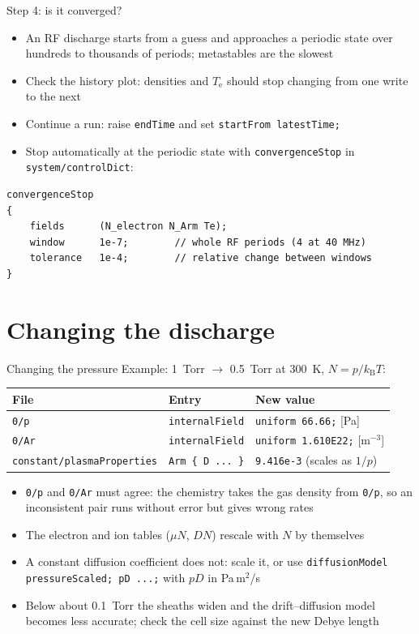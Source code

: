 \documentclass[aspectratio=169,11pt]{beamer}
\newcommand{\kw}[1]{\texttt{#1}}
\newcommand{\Te}{T_\mathrm{e}}
\begin{document}
\begin{frame}[fragile]{Step 4: is it converged?}
  \begin{itemize}
    \item An RF discharge starts from a guess and approaches a periodic state over
          hundreds to thousands of periods; metastables are the slowest
    \item Check the history plot: densities and $\Te$ should stop changing from one
          write to the next
    \item Continue a run: raise \kw{endTime} and set \kw{startFrom latestTime;}
    \item Stop automatically at the periodic state with \kw{convergenceStop} in
          \kw{system/controlDict}:
  \end{itemize}
  \small
\begin{verbatim}
convergenceStop
{
    fields      (N_electron N_Arm Te);
    window      1e-7;        // whole RF periods (4 at 40 MHz)
    tolerance   1e-4;        // relative change between windows
}
\end{verbatim}
\end{frame}

\section{Changing the discharge}

\begin{frame}[fragile]{Changing the pressure}
  Example: 1~Torr $\rightarrow$ 0.5~Torr at 300~K, $N=p/k_\mathrm{B}T$:
  \begin{center}\small
  \begin{tabular}{lll}
    \toprule
    File & Entry & New value \\
    \midrule
    \kw{0/p} & \kw{internalField} & \kw{uniform 66.66;} [Pa] \\
    \kw{0/Ar} & \kw{internalField} & \kw{uniform 1.610E22;} [m$^{-3}$] \\
    \kw{constant/plasmaProperties} & \kw{Arm \{ D ... \}} & \kw{9.416e-3} (scales as $1/p$) \\
    \bottomrule
  \end{tabular}
  \end{center}
  \begin{itemize}\small
    \item \kw{0/p} and \kw{0/Ar} must agree: the chemistry takes the gas density from
          \kw{0/p}, so an inconsistent pair runs without error but gives wrong rates
    \item The electron and ion tables ($\mu N$, $DN$) rescale with $N$ by themselves
    \item A constant diffusion coefficient does not: scale it, or use
          \kw{diffusionModel pressureScaled; pD ...;} with $pD$ in Pa\,m$^2$/s
    \item Below about 0.1~Torr the sheaths widen and the drift--diffusion model becomes
          less accurate; check the cell size against the new Debye length
  \end{itemize}
\end{frame}
\end{document}

